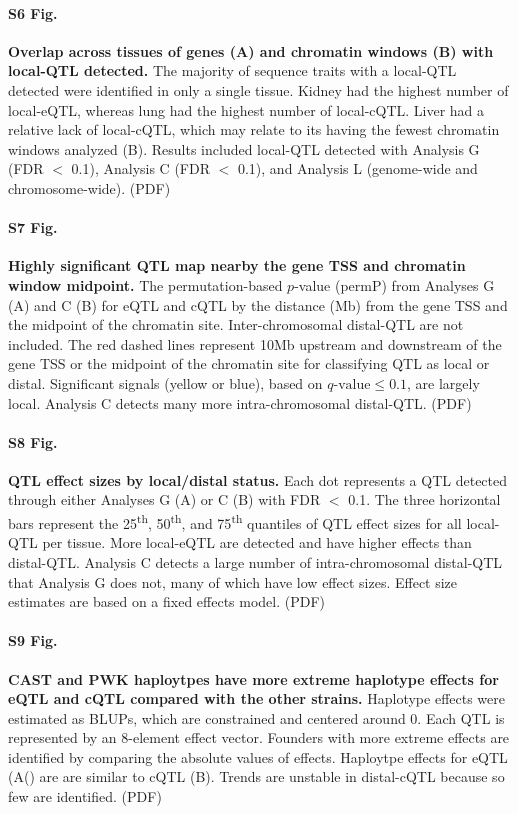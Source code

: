 \documentclass[10pt,letterpaper]{article}
\begin{document}
\paragraph*{S6 Fig.}
\label{S_upset_qtl}
{\bf Overlap across tissues of genes (A) and chromatin windows (B) with local-QTL detected.} 
The majority of sequence traits with a local-QTL detected were identified in only a single tissue. Kidney had the highest number of local-eQTL, whereas lung had the highest number of local-cQTL. Liver had a relative lack of local-cQTL, which may relate to its having the fewest chromatin windows analyzed (B). Results included local-QTL detected with Analysis G (FDR $<$ 0.1), Analysis C (FDR $<$ 0.1), and Analysis L (genome-wide and chromosome-wide). (PDF)

\paragraph*{S7 Fig.}
\label{S_dist}
{\bf Highly significant QTL map nearby the gene TSS and chromatin window midpoint.}
The permutation-based $p$-value (permP) from Analyses G (A) and C (B) for eQTL and cQTL by the distance (Mb) from the gene TSS and the midpoint of the chromatin site. Inter-chromosomal distal-QTL are not included. The red dashed lines represent 10Mb upstream and downstream of the gene TSS or the midpoint of the chromatin site for classifying QTL as local or distal. Significant signals (yellow or blue), based on $q\text{-value} \le 0.1$, are largely local. Analysis C detects many more intra-chromosomal distal-QTL. (PDF)

\paragraph*{S8 Fig.}
\label{S_effect_size_status}
{\bf QTL effect sizes by local/distal status.}
Each dot represents a QTL detected through either Analyses G (A) or C (B) with FDR $<$ 0.1. The three horizontal bars represent the 25\textsuperscript{th}, 50\textsuperscript{th}, and 75\textsuperscript{th} quantiles of QTL effect sizes for all local-QTL per tissue. More local-eQTL are detected and have higher effects than distal-QTL. Analysis C detects a large number of intra-chromosomal distal-QTL that Analysis G does not, many of which have low effect sizes. Effect size estimates are based on a fixed effects model. (PDF)

\paragraph*{S9 Fig.}
\label{S_qtl_effects_abs}
{\bf CAST and PWK haploytpes have more extreme haplotype effects for eQTL and cQTL compared with the other strains.}
Haplotype effects were estimated as BLUPs, which are constrained and centered around 0. Each QTL is represented by an 8-element effect vector. Founders with more extreme effects are identified by comparing the absolute values of effects. Haploytpe effects for eQTL (A() are are similar to cQTL (B). Trends are unstable in distal-cQTL because so few are identified. (PDF)
\end{document}
